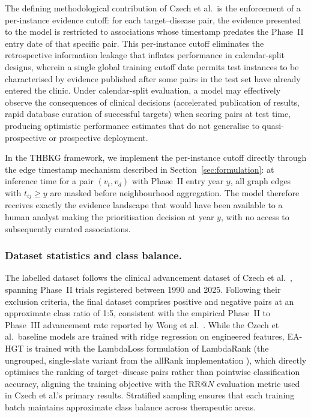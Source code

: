 \documentclass[a4,center]{NAR}
\newcommand{\eahgt}{\textsc{EA-HGT}}
\begin{document}
{The defining methodological contribution of Czech et al.\ is the
enforcement of a per-instance evidence cutoff: for each target--disease
pair, the evidence presented to the model is restricted to associations
whose timestamp predates the Phase~II entry date of that specific pair.
This per-instance cutoff eliminates the retrospective information leakage
that inflates performance in calendar-split designs, wherein a single
global training cutoff date permits test instances to be characterised by
evidence published after some pairs in the test set have already entered
the clinic. Under calendar-split evaluation, a model may effectively
observe the consequences of clinical decisions (accelerated publication of
results, rapid database curation of successful targets) when scoring pairs
at test time, producing optimistic performance estimates that do not
generalise to quasi-prospective or prospective deployment.

In the THBKG framework, we implement the per-instance cutoff directly
through the edge timestamp mechanism described in
Section~\ref{sec:formulation}: at inference time for a pair
$(v_t, v_d)$ with Phase~II entry year $y$, all graph edges with
$t_{ij} \geq y$ are masked before neighbourhood aggregation. The model
therefore receives exactly the evidence landscape that would have been
available to a human analyst making the prioritisation decision at year
$y$, with no access to subsequently curated associations.

\subsubsection{Dataset statistics and class balance.}

The labelled dataset follows the clinical advancement dataset of Czech
et al.\ \citep{Czech2024CLINICALFORECASTING}, spanning Phase~II trials registered between
1990 and 2025. Following their exclusion criteria, the final dataset
comprises positive and negative pairs at an approximate class ratio of
1:5, consistent with the empirical Phase~II to Phase~III advancement rate
reported by Wong et al.\ \citep{Wong2019EstimationParameters}. While the Czech et al.\
baseline models are trained with ridge regression on engineered features,
\eahgt{} is trained with the LambdaLoss formulation of LambdaRank
\citep{Wang2018TheOptimization} (the ungrouped, single-slate variant from the
allRank implementation \citep{Pobrotyn2020ContextAwareLearning}), which
directly optimises the ranking of target--disease pairs rather than
pointwise classification accuracy, aligning the training objective with
the RR@$N$ evaluation metric used in Czech et al.'s primary results.
Stratified sampling ensures that each training batch maintains
approximate class balance across therapeutic areas.

}
\end{document}
